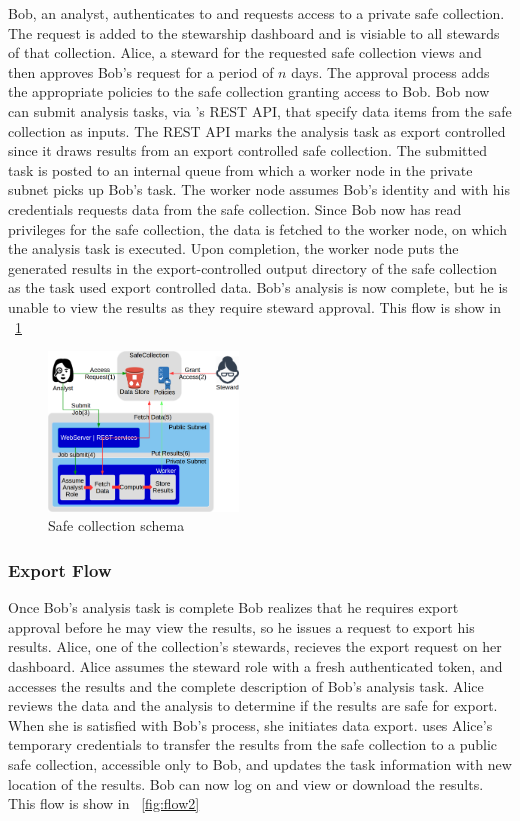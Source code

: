 Bob, an analyst, authenticates to \NAME and requests access to a private safe collection.
The request is added to the stewarship dashboard and is visiable to all stewards
of that collection. Alice, a steward for the requested
safe collection views and then approves Bob's request for a period of $n$ days. 
The approval process adds the appropriate policies to the
safe collection granting access to Bob. Bob now can submit analysis tasks, via 
\NAMENS's REST API, that specify data items from the safe collection as inputs. 
The REST API marks the analysis task as export controlled since it draws results
from an export controlled safe collection. 
The submitted task is posted to an internal queue from which a
worker node in the \NAME private subnet picks up Bob's task. The worker node assumes Bob's identity and with
his credentials requests data from the safe collection. Since Bob now has read privileges for the
safe collection, the data is fetched to the worker node, on which the analysis task is executed.
Upon completion, the worker node puts the generated results in the export-controlled 
output directory of the safe collection as the task used export controlled data. 
Bob's analysis is now complete, but he is unable to view the
results as they require steward approval. This flow is show in \figurename~\ref{fig:flow1}

\begin{figure}
  \center
  \includegraphics[width=0.45\textwidth]{figures/safe_flow.png}
  \caption{Safe collection schema}
  \label{fig:flow1}
  \vspace{-1.5em}
\end{figure}


\subsubsection{Export Flow}

Once Bob's analysis task is complete Bob realizes that he requires export approval before he may view the
results, so he issues a request to export his results. Alice, one of the collection's stewards, recieves
the export request on her dashboard. Alice assumes
the steward role with a fresh authenticated token, and accesses the results and the complete description
of Bob's analysis task. Alice reviews the data and the analysis to determine if the results are
safe for export. When she is satisfied with Bob's process, she initiates data export. \NAME
uses Alice's temporary credentials to transfer the results from the safe collection to a public
safe collection, accessible only to Bob, and updates the task information with new location of the results. Bob can now log on
and view or download the results. This flow is show in \figurename~\ref{fig:flow2}

